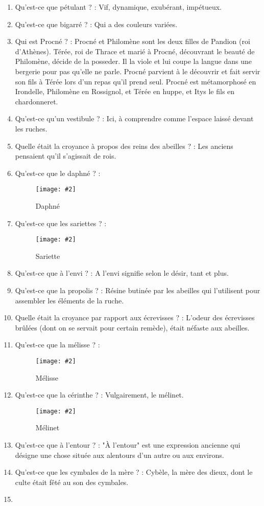 \documentclass[a4paper, 11pt, hidelinks]{article}
\newcommand{\img}[4]{\begin{figure}[!ht]
    \centering
    \texttt{[image: \#2]}
    \caption{#3}
    \label{#4}
    \end{figure} }
\begin{document}
\begin{enumerate}
      \item Qu'est-ce que pétulant ? : Vif, dynamique, exubérant, impétueux.
      \item Qu'est-ce que bigarré ? : Qui a des couleurs variées.
      \item Qui est Procné ? : Procné et Philomène sont les deux filles de Pandion (roi d'Athènes).
            Térée, roi de Thrace et marié à Procné, découvrant le beauté de Philomène, décide de la posseder.
            Il la viole et lui coupe la langue dans une bergerie pour pas qu'elle ne parle.
            Procné parvient à le découvrir et fait servir son fils à Térée lors d'un repas qu'il prend seul.
            Procné est métamorphosé en Irondelle, Philomène en Rossignol, et Térée en huppe, et Itys le fils en chardonneret.
      \item Qu'est-ce qu'un vestibule ? : Ici, à comprendre comme l'espace laissé devant les ruches.
      \item Quelle était la croyance à propos des reins des abeilles ? : Les anciens pensaient qu'il s'agissait de rois.
      \item Qu'est-ce que le daphné ? :
            \img{0.5}{Daphne.jpg}{Daphné}{131}
      \item Qu'est-ce que les sariettes ? :
            \img{0.5}{Sariette.jpg}{Sariette}{132}
      \item Qu'est-ce que à l'envi ? : A l'envi signifie selon le désir, tant et plus.
      \item Qu'est-ce que la propolis ? : Résine butinée par les abeilles qui l'utilisent pour assembler les éléments de la ruche.
      \item Quelle était la croyance par rapport aux écrevisses ? : L'odeur des écrevisses brûlées (dont on se servait pour certain remède),
            était néfaste aux abeilles.
      \item Qu'est-ce que la mélisse ? :
            \img{0.5}{Melisse.jpg}{Mélisse}{133}
      \item Qu'est-ce que la cérinthe ? : Vulgairement, le mélinet.
            \img{0.5}{Melinet.jpg}{Mélinet}{134}
      \item Qu'est-ce que à l'entour ? : "À l'entour" est une expression ancienne qui désigne une chose située aux alentours d'un autre ou aux environs.
      \item Qu'est-ce que les cymbales de la mère ? : Cybèle, la mère des dieux, dont le culte était fêté au son des cymbales.
      \item 
\end{enumerate}
\end{document}
